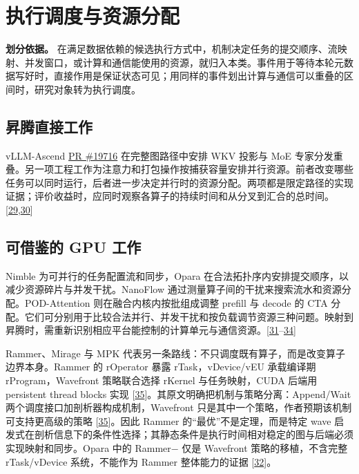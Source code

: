 \documentclass[
  UTF8,
  zihao=5]{ctexart}
\begin{document}
\hypertarget{scheduling}{%
\section{执行调度与资源分配}\label{scheduling}}

\textbf{划分依据。}
在满足数据依赖的候选执行方式中，机制决定任务的提交顺序、流映射、并发窗口，或计算和通信能使用的资源，就归入本类。事件用于等待本轮元数据写好时，直接作用是保证状态可见；用同样的事件划出计算与通信可以重叠的区间时，研究对象转为执行调度。

\hypertarget{ux6607ux817eux76f4ux63a5ux5de5ux4f5c-3}{%
\subsection{昇腾直接工作}\label{ux6607ux817eux76f4ux63a5ux5de5ux4f5c-3}}

vLLM-Ascend
\href{https://github.com/vllm-project/vllm-ascend/pull/19716}{PR
\#19716} 在完整图路径中安排 WKV 投影与 MoE
专家分发重叠。另一项工程工作为注意力和打包操作按捕获容量安排并行资源。前者改变哪些任务可以同时运行，后者进一步决定并行时的资源分配。两项都是限定路径的实现证据；评价收益时，应同时观察各算子的持续时间和从分叉到汇合的总时间。{[}\protect\hyperlink{ref-ascend19716}{29},\protect\hyperlink{ref-ascend19909}{30}{]}

\hypertarget{ux53efux501fux9274ux7684-gpu-ux5de5ux4f5c-3}{%
\subsection{可借鉴的 GPU
工作}\label{ux53efux501fux9274ux7684-gpu-ux5de5ux4f5c-3}}

Nimble 为可并行的任务配置流和同步，Opara
在合法拓扑序内安排提交顺序，以减少资源碎片与并发干扰。NanoFlow
通过测量算子间的干扰来搜索流水和资源分配。POD-Attention
则在融合内核内按批组成调整 prefill 与 decode 的 CTA
分配。它们可分别用于比较合法并行、并发干扰和按负载调节资源三种问题。映射到昇腾时，需重新识别相应平台能控制的计算单元与通信资源。{[}\protect\hyperlink{ref-kwon2020nimble}{31}--\protect\hyperlink{ref-kamath2025pod}{34}{]}

Rammer、Mirage 与 MPK
代表另一条路线：不只调度既有算子，而是改变算子边界本身。Rammer 的
rOperator 暴露 rTask，vDevice/vEU 承载编译期 rProgram，Wavefront
策略联合选择 rKernel 与任务映射，CUDA 后端用 persistent thread blocks
实现
{[}\protect\hyperlink{ref-ma2020rammer}{35}{]}。其原文明确把机制与策略分离：Append/Wait
两个调度接口加剖析器构成机制，Wavefront
只是其中一个策略，作者预期该机制可支持更高级的策略
{[}\protect\hyperlink{ref-ma2020rammer}{35}{]}。因此 Rammer
的``最优''不是定理，而是特定 wave
启发式在剖析信息下的条件性选择；其静态条件是执行时间相对稳定的图与后端必须实现映射和同步。Opara
中的 Rammer− 仅是 Wavefront 策略的移植，不含完整 rTask/vDevice
系统，不能作为 Rammer 整体能力的证据
{[}\protect\hyperlink{ref-chen2025opara}{32}{]}。
\end{document}
